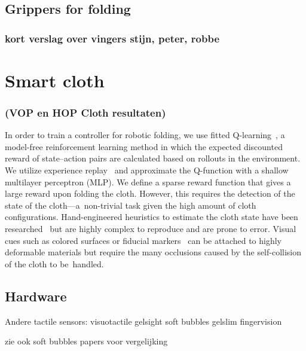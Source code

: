 \documentclass[\home/main.tex]{subfiles}
\begin{document}
\subsection{Grippers for folding}
\subsubsection{kort verslag over vingers stijn, peter, robbe}


\section{Smart cloth}
\subsubsection{(VOP en HOP Cloth resultaten)}


In order to train a controller for robotic folding, we use fitted Q-learning~\cite{Watkins1992}, a model-free reinforcement learning method in which the expected discounted reward of state--action pairs are calculated based on rollouts in the environment. We utilize experience replay~\cite{Lin1992} and approximate the Q-function with a shallow multilayer perceptron (MLP). We define a sparse reward function that gives a large reward upon folding the cloth. However, this requires the detection of the state of the cloth---a~non-trivial task given the high amount of cloth configurations. Hand-engineered heuristics to estimate the cloth state have been researched~\cite{Doumanoglou2016} but are highly complex to reproduce and are prone to error. Visual cues such as colored surfaces or fiducial markers~\cite{Bersch2011, Tsurumine2019} can be attached to highly deformable materials but require the many occlusions caused by the self-collision of the cloth to be~handled.

\subsection{Hardware} 

Andere tactile sensors:
    visuotactile
        gelsight
        soft bubbles
        gelslim
        fingervision

    zie ook soft bubbles papers voor vergelijking 
\end{document}
